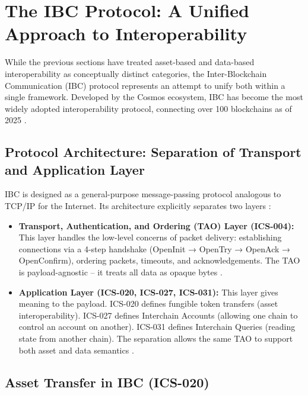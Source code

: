 \section{The IBC Protocol: A Unified Approach to
Interoperability}\label{the-ibc-protocol-a-unified-approach-to-interoperability}

While the previous sections have treated asset-based and data-based
interoperability as conceptually distinct categories, the
Inter-Blockchain Communication (IBC) protocol represents an attempt to
unify both within a single framework. Developed by the Cosmos ecosystem,
IBC has become the most widely adopted interoperability protocol,
connecting over 100 blockchains as of 2025 \citep{ibc2024transportapp}
\citep{Belchior_2021}.

\subsection{Protocol Architecture: Separation of Transport and
Application
Layer}\label{protocol-architecture-separation-of-transport-and-application-layer}

IBC is designed as a general-purpose message-passing protocol analogous
to TCP/IP for the Internet. Its architecture explicitly separates two
layers \citep{cosmos2024ibcintro} \citep{goes2020interblockchain}:

\begin{itemize}
\item
  \textbf{Transport, Authentication, and Ordering (TAO) Layer
  (ICS-004):} This layer handles the low-level concerns of packet
  delivery: establishing connections via a 4-step handshake (OpenInit →
  OpenTry → OpenAck → OpenConfirm), ordering packets, timeouts, and
  acknowledgements. The TAO is payload-agnostic -- it treats all data as
  opaque bytes \citep{Wei_2023} \citep{ibc2025howworks}.
\item
  \textbf{Application Layer (ICS-020, ICS-027, ICS-031):} This layer
  gives meaning to the payload. ICS-020 defines fungible token transfers
  (asset interoperability). ICS-027 defines Interchain Accounts
  (allowing one chain to control an account on another). ICS-031 defines
  Interchain Queries (reading state from another chain). The separation
  allows the same TAO to support both asset and data semantics
  \citep{quasar2023litepaper} \citep{ibc2024transportapp}.
\end{itemize}

\subsection{Asset Transfer in IBC
(ICS-020)}\label{asset-transfer-in-ibc-ics-020}

